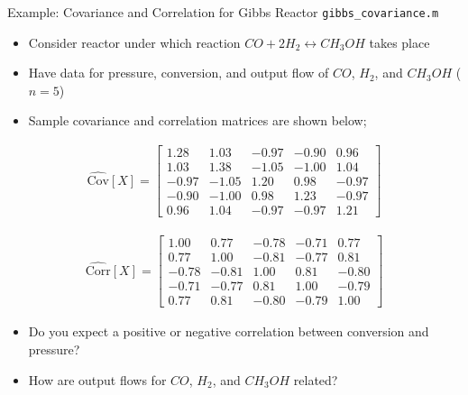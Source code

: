 \documentclass[9pt]{beamer}
\begin{document}
%
\begin{frame}{Example: Covariance and Correlation for Gibbs Reactor \footnotesize{\texttt{gibbs\_covariance.m}}}

\begin{itemize}
\setlength{\itemsep}{3pt}
\item Consider reactor under which reaction $CO+2H_2\leftrightarrow CH_3OH$ takes place
\item Have data for pressure, conversion, and output flow of $CO$, $H_2$, and $CH_3OH$ ($n=5$)
\item Sample covariance and correlation matrices are shown below;
\end{itemize}

\begin{align*}
\hat{\textrm{Cov}}[X]=\left[\begin{array}{ccccc}
 		  1.28   &       1.03   &      -0.97    &     -0.90    &      0.96\\
          1.03     &     1.38    &     -1.05    &     -1.00    &      1.04\\
         -0.97      &   -1.05    &      1.20    &      0.98    &     -0.97\\
         -0.90   &      -1.00    &      0.98   &       1.23   &      -0.97\\
          0.96     &     1.04     &    -0.97    &     -0.97   &       1.21
\end{array}\right]
\end{align*}

\begin{align*}
\hat{\textrm{Corr}}[X]=\left[\begin{array}{ccccc}
1.00   &       0.77   &      -0.78   &      -0.71    &      0.77\\
          0.77    &      1.00    &     -0.81    &     -0.77    &      0.81\\
         -0.78   &      -0.81   &       1.00   &       0.81   &      -0.80\\
         -0.71    &     -0.77   &       0.81    &      1.00     &    -0.79\\
          0.77     &     0.81    &     -0.80    &     -0.79    &      1.00
\end{array}\right]
\end{align*}

\begin{block}{}
\begin{itemize}
\item Do you expect a positive or negative correlation between conversion and pressure?
 \item How are output flows for $CO$, $H_2$, and $CH_3OH$ related?
\end{itemize}
\end{block}

\end{frame}
\end{document}
